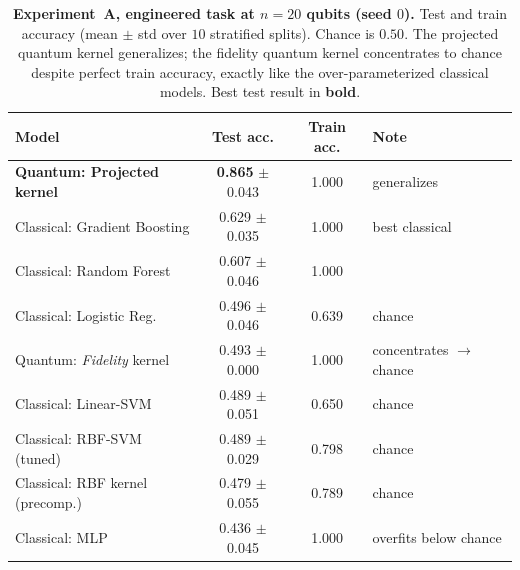 \begin{table}[t]
    \centering
    \caption{\textbf{Experiment~A, engineered task at $n=20$ qubits (seed $0$).}
    Test and train accuracy (mean $\pm$ std over $10$ stratified splits). Chance
    is $0.50$. The projected quantum kernel generalizes; the fidelity quantum
    kernel concentrates to chance despite perfect train accuracy, exactly like the
    over-parameterized classical models. Best test result in \textbf{bold}.}
    \label{tab:exp_a_headline}
    \begin{tabular}{@{}lccl@{}}
        \toprule
        \textbf{Model} & \textbf{Test acc.} & \textbf{Train acc.} & \textbf{Note} \\
        \midrule
        \textbf{Quantum: Projected kernel} & \textbf{0.865} {\scriptsize $\pm$ 0.043} & 1.000 & generalizes \\
        \midrule
        Classical: Gradient Boosting & 0.629 {\scriptsize $\pm$ 0.035} & 1.000 & best classical \\
        Classical: Random Forest & 0.607 {\scriptsize $\pm$ 0.046} & 1.000 & \\
        Classical: Logistic Reg. & 0.496 {\scriptsize $\pm$ 0.046} & 0.639 & chance \\
        Quantum: \emph{Fidelity} kernel & 0.493 {\scriptsize $\pm$ 0.000} & 1.000 & concentrates $\to$ chance \\
        Classical: Linear-SVM & 0.489 {\scriptsize $\pm$ 0.051} & 0.650 & chance \\
        Classical: RBF-SVM (tuned) & 0.489 {\scriptsize $\pm$ 0.029} & 0.798 & chance \\
        Classical: RBF kernel (precomp.) & 0.479 {\scriptsize $\pm$ 0.055} & 0.789 & chance \\
        Classical: MLP & 0.436 {\scriptsize $\pm$ 0.045} & 1.000 & overfits below chance \\
        \bottomrule
    \end{tabular}
\end{table}
